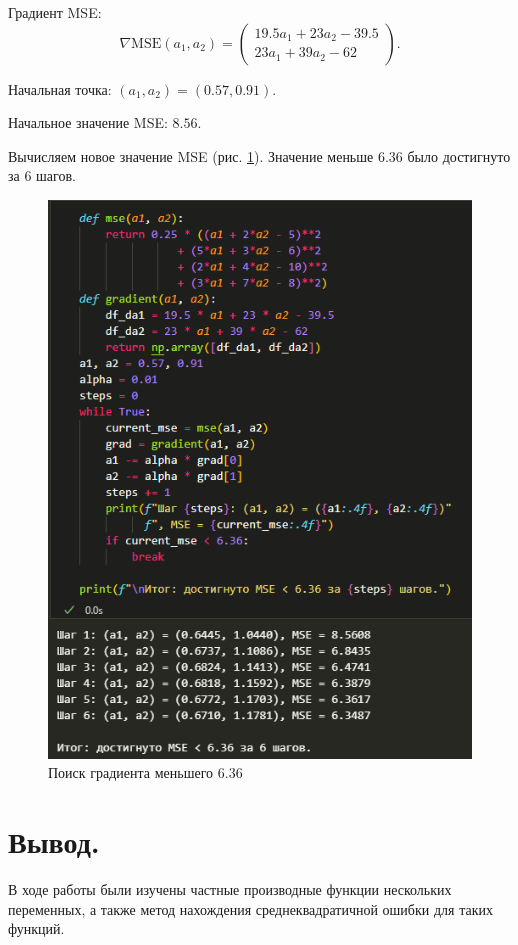 \documentclass[14pt,a4paper]{extarticle}
\begin{document}
Градиент MSE:
\[\nabla \text{MSE}(a_1, a_2) = \begin{pmatrix}19.5a_1 + 23a_2 - 39.5 \\ 23a_1 + 39a_2 - 62\end{pmatrix}.\]

Начальная точка: $(a_1, a_2) = (0.57, 0.91).$

Начальное значение MSE: $8.56.$

Вычисляем новое значение MSE (рис. \ref{pic:mse}). Значение меньше $6.36$ было достигнуто за 6 шагов.

\begin{figure}[h!]
    \centering
    \includegraphics[scale=0.7]{figures/mse.png}
    \caption{Поиск градиента меньшего $6.36$}
    \label{pic:mse}
\end{figure}

\section*{Вывод.}

В ходе работы были изучены частные производные функции нескольких переменных,
а также метод нахождения среднеквадратичной ошибки для таких функций.
\end{document}
